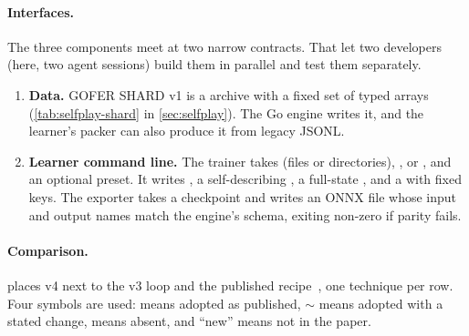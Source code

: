 \paragraph{Interfaces.}
The three components meet at two narrow contracts. That let two developers (here, two
agent sessions) build them in parallel and test them separately.
\begin{enumerate}
  \item \textbf{Data.} GOFER SHARD v1 is a  archive with a fixed set of typed
        arrays (\cref{tab:selfplay-shard} in \cref{sec:selfplay}). The Go engine writes
        it, and the learner's packer can also produce it from legacy JSONL.
  \item \textbf{Learner command line.} The trainer takes  (files or directories),
        ,  or , and an optional
         preset. It writes , a self-describing
        , a full-state , and a  with
        fixed keys. The exporter takes a checkpoint and writes an ONNX file whose input and
        output names match the engine's schema, exiting non-zero if parity fails.
\end{enumerate}

\paragraph{Comparison.}
 places v4 next to the v3 loop and the published \katago{}
recipe~\citep{wu2019accelerating}, one technique per row. Four symbols are used:
\checkmark{} means adopted as published, $\sim$ means adopted with a stated change,
\texttimes{} means absent, and ``new'' means not in the \katago{} paper.

